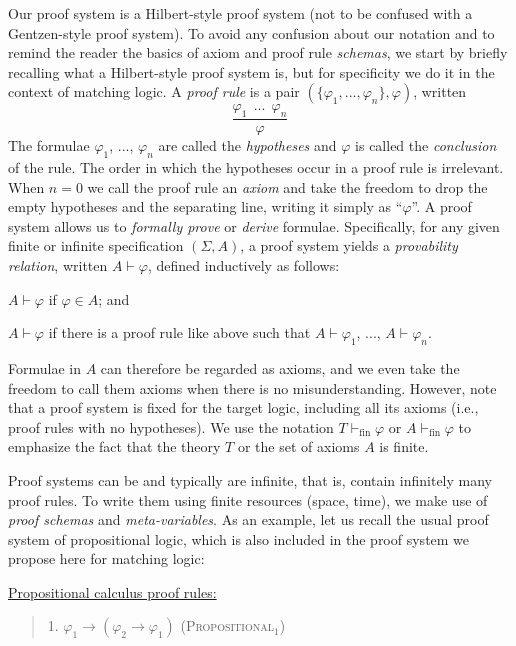 \documentclass[UTF8,11pt]{article}
\theoremstyle{plain}
\theoremstyle{definition}
\theoremstyle{remark}
\newcommand{\vdashfin}{\vdash_\text{fin}}
\newcommand{\ra}{\rightarrow}
\begin{document}
\newcommand{\sequent}[2]{{#1}\vdash{#2}}

Our proof system is a Hilbert-style proof system (not to be confused with a
Gentzen-style proof system).
To avoid any confusion about our notation and to remind the reader the
basics of axiom and proof rule \emph{schemas}, we start by briefly recalling
what a Hilbert-style proof system is, but for specificity we do it in the
context of matching logic.
A \emph{proof rule} is a pair $(\{\varphi_1,...,\varphi_n\},\varphi)$,
written
$$
\frac{
\varphi_1 \ \ ... \ \ \varphi_n
}{\varphi}
$$
The formulae $\varphi_1$, ..., $\varphi_n$ are called the \emph{hypotheses}
and $\varphi$ is called the \emph{conclusion} of the rule.
The order in which the hypotheses occur in a proof rule is irrelevant.
When $n = 0$ we call the proof rule an \emph{axiom} and take the freedom to
drop the empty hypotheses and the separating line, writing it simply as
``$\varphi$''.
A proof system allows us to \emph{formally prove} or \emph{derive} formulae.
Specifically, for any given finite or infinite specification $(\Sigma,A)$,
a proof system yields a \emph{provability relation},
written $\sequent{A}{\varphi}$, defined inductively as follows:

$\sequent{A}{\varphi}$ if $\varphi \in A$; and

$\sequent{A}{\varphi}$ if there is a proof rule like above such that
$\sequent{A}{\varphi_1}$, ..., $\sequent{A}{\varphi_n}$.

\noindent
Formulae in $A$ can therefore be regarded as axioms, and we even take the
freedom to call them axioms when there is no misunderstanding.
However, note that a proof system is fixed for the target logic, including
all its axioms (i.e., proof rules with no hypotheses).
We use the notation $T \vdashfin \varphi$ or $A \vdashfin \varphi$ to
emphasize the fact that the theory $T$ or the set of axioms $A$ is finite.

Proof systems can be and typically are infinite, that is, contain infinitely
many proof rules.
To write them using finite resources (space, time), we make use of \emph{proof schemas}
and \emph{meta-variables}.
As an example, let us recall the usual proof system of propositional logic,
which is also included in the proof system we propose here for matching logic:

\vspace*{2ex}

\noindent
\underline{Propositional calculus proof rules:}

\begin{quote}
1. $\varphi_1 \ra (\varphi_2 \ra \varphi_1)$
\hfill \textsc{(Propositional$_1$)}
\end{quote}
\end{document}
